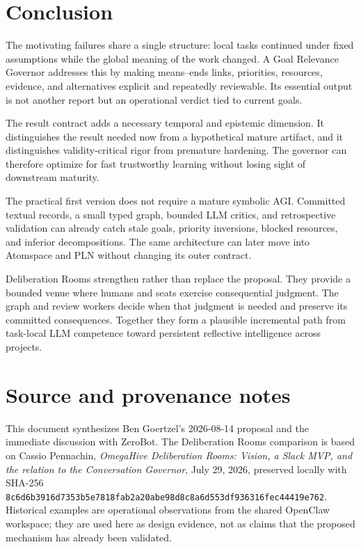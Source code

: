 \documentclass[11pt,letterpaper]{article}
\begin{document}
\section{Conclusion}

The motivating failures share a single structure: local tasks continued under
fixed assumptions while the global meaning of the work changed. A Goal
Relevance Governor addresses this by making means--ends links, priorities,
resources, evidence, and alternatives explicit and repeatedly reviewable. Its
essential output is not another report but an operational verdict tied to
current goals.

The result contract adds a necessary temporal and epistemic dimension. It
distinguishes the result needed now from a hypothetical mature artifact, and
it distinguishes validity-critical rigor from premature hardening. The
governor can therefore optimize for fast trustworthy learning without losing
sight of downstream maturity.

The practical first version does not require a mature symbolic AGI. Committed
textual records, a small typed graph, bounded LLM critics, and retrospective
validation can already catch stale goals, priority inversions, blocked
resources, and inferior decompositions. The same architecture can later move
into Atomspace and PLN without changing its outer contract.

Deliberation Rooms strengthen rather than replace the proposal. They provide
a bounded venue where humans and seats exercise consequential judgment. The
graph and review workers decide when that judgment is needed and preserve its
committed consequences. Together they form a plausible incremental path from
task-local LLM competence toward persistent reflective intelligence across
projects.

\enlargethispage{4\baselineskip}
\section*{Source and provenance notes}

This document synthesizes Ben Goertzel's 2026-08-14 proposal and the immediate
discussion with ZeroBot. The Deliberation Rooms comparison is based on Cassio
Pennachin, \emph{OmegaHive Deliberation Rooms: Vision, a Slack MVP, and the
relation to the Conversation Governor}, July 29, 2026, preserved locally with
SHA-256
\texttt{8c6d6b3916d7353b5e7818fab2a20abe98d8c8a6d553df936316fec44419e762}.
Historical examples are operational observations from the shared OpenClaw
workspace; they are used here as design evidence, not as claims that the
proposed mechanism has already been validated.
\end{document}

